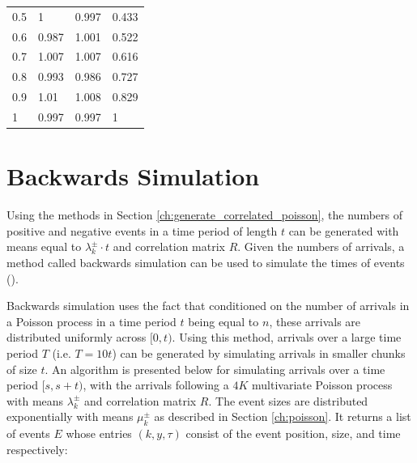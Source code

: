 \begin{table}
\begin{tabular}{l|l|l|l}
0.5                 & 1                               & 0.997                           & 0.433               \\
0.6                 & 0.987                           & 1.001                           & 0.522               \\
0.7                 & 1.007                           & 1.007                           & 0.616               \\
0.8                 & 0.993                           & 0.986                           & 0.727               \\
0.9                 & 1.01                            & 1.008                           & 0.829               \\
1                   & 0.997                           & 0.997                           & 1                  
\end{tabular}
\end{table}

\section{Backwards Simulation} \label{ch:backwards_simulation}

Using the methods in Section \ref{ch:generate_correlated_poisson}, the numbers of positive and negative events in a time period of length $t$ can be generated with means equal to $\lambda^{\pm}_k \cdot t$ and correlation matrix $R$. Given the numbers of arrivals, a method called backwards simulation can be used to simulate the times of events (\cite{A7}). 

Backwards simulation uses the fact that conditioned on the number of arrivals in a Poisson process in a time period $t$ being equal to $n$, these arrivals are distributed uniformly across $[0,t)$. Using this method, arrivals over a large time period $T$ (i.e. $T = 10t$) can be generated by simulating arrivals in smaller chunks of size $t$. An algorithm is presented below for simulating arrivals over a time period $[s,s+t)$, with the arrivals following a $4K$ multivariate Poisson process with means $\lambda^{\pm}_k$ and correlation matrix $R$. The event sizes are distributed exponentially with means $\mu^{\pm}_k$ as described in Section \ref{ch:poisson}. It returns a list of events $E$ whose entries $(k,y,\tau)$ consist of the event position, size, and time respectively:
$$ $$

